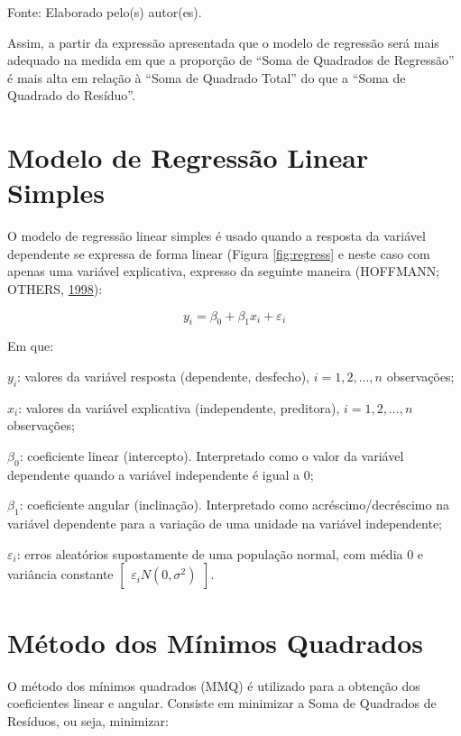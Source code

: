 \documentclass[12pt,brazil,]{book}
\begin{document}
Fonte: Elaborado pelo(s) autor(es).

Assim, a partir da expressão apresentada que o modelo de regressão será
mais adequado na medida em que a proporção de ``Soma de Quadrados de
Regressão'' é mais alta em relação à ``Soma de Quadrado Total'' do que a
``Soma de Quadrado do Resíduo''.

\hypertarget{modelo-de-regressao-linear-simples}{%
\section{Modelo de Regressão Linear
Simples}\label{modelo-de-regressao-linear-simples}}

O modelo de regressão linear simples é usado quando a resposta da
variável dependente se expressa de forma linear (Figura
\ref{fig:regress} e neste caso com apenas uma variável explicativa,
expresso da seguinte maneira (HOFFMANN; OTHERS,
\protect\hyperlink{ref-hoffmann1998}{1998}):

\[
y_i=\beta_0+\beta_1x_i+\varepsilon _i
\]

Em que:

\(y_i\): valores da variável resposta (dependente, desfecho),
\(i = 1,2,...,n\) observações;

\(x_i\): valores da variável explicativa (independente, preditora),
\(i = 1,2,...,n\) observações;

\(\beta_0\): coeficiente linear (intercepto). Interpretado como o valor
da variável dependente quando a variável independente é igual a 0;

\(\beta_1\): coeficiente angular (inclinação). Interpretado como
acréscimo/decréscimo na variável dependente para a variação de uma
unidade na variável independente;

\(\varepsilon_i\): erros aleatórios supostamente de uma população
normal, com média 0 e variância constante
\(\begin{bmatrix}\varepsilon_i N(0, \sigma^2)\end{bmatrix}\).

\hypertarget{metodo-dos-minimos-quadrados}{%
\section{Método dos Mínimos
Quadrados}\label{metodo-dos-minimos-quadrados}}

O método dos mínimos quadrados (MMQ) é utilizado para a obtenção dos
coeficientes linear e angular. Consiste em minimizar a Soma de Quadrados
de Resíduos, ou seja, minimizar:
\end{document}
